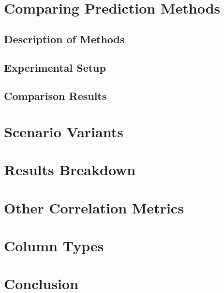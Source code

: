 \documentclass[
  11pt,
  authoryear,
  preprint]{elsarticle}
\begin{document}
\section{Comparing Prediction
Methods}\label{comparing-prediction-methods}

\subsection{Description of Methods}\label{description-of-methods}

\subsection{Experimental Setup}\label{experimental-setup}

\subsection{Comparison Results}\label{comparison-results}

\section{Scenario Variants}\label{scenario-variants}

\section{Results Breakdown}\label{results-breakdown}

\section{Other Correlation Metrics}\label{other-correlation-metrics}

\section{Column Types}\label{column-types}

\section{Conclusion}\label{conclusion}


\renewcommand\refname{References}
  
\end{document}
